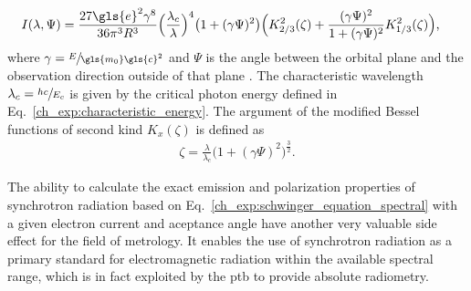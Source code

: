 \begin{align}
  I(\lambda,\Psi) &= \frac{27 \gls{e}^2 \gamma^8 }{36 \pi^3 R^3} \Big(\frac{\lambda_c}{\lambda}\Big)^4 \big(1+ (\gamma \Psi)^2\big)\Big( K_{2/3}^2(\zeta) + \frac{(\gamma \Psi)^2}{1 + (\gamma \Psi)^2} K_{1/3}^2(\zeta)\Big) \text{,}
 \label{ch_exp:schwinger_equation_spectral}
\end{align}
where $\gamma = \sfrac{E}{\gls{m_0} \gls{c}^2}$ and $\Psi$ is the angle between the orbital plane and the observation direction outside of that plane \cite{schwinger_classical_1949}. The characteristic wavelength $\lambda_c = \sfrac{h c}{E_c}$ is given by the critical photon energy defined in Eq.~\eqref{ch_exp:characteristic_energy}. The argument of the modified Bessel functions of second kind $K_{x}(\zeta)$ is defined as
\begin{align}
 \zeta = \frac{\lambda}{\lambda_c} \big(1 + (\gamma \Psi)^2\big)^\frac{3}{2} \text{.}
\end{align}


The ability to calculate the exact emission and polarization properties of synchrotron radiation based on Eq.~\eqref{ch_exp:schwinger_equation_spectral} with a given electron current and aceptance angle have another very valuable side effect for the field of metrology. It enables the use of synchrotron radiation as a primary standard for electromagnetic radiation within the available spectral range, which is in fact exploited by the \gls{ptb} \cite{thornagel_electron_2001} to provide absolute radiometry.

